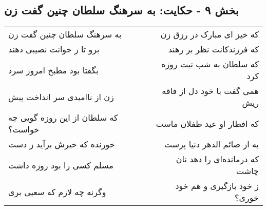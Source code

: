 \begin{center}
\section*{بخش ۹ - حکایت: به سرهنگ سلطان چنین گفت زن}
\label{sec:009}
\begin{longtable}{l p{0.5cm} r}
به سرهنگ سلطان چنین گفت زن
&&
که خیز ای مبارک در رزق زن
\\
برو تا ز خوانت نصیبی دهند
&&
که فرزندکانت نظر بر رهند
\\
بگفتا بود مطبخ امروز سرد
&&
که سلطان به شب نیت روزه کرد
\\
زن از ناامیدی سر انداخت پیش
&&
همی گفت با خود دل از فاقه ریش
\\
که سلطان از این روزه گویی چه خواست؟
&&
که افطار او عید طفلان ماست
\\
خورنده که خیرش برآید ز دست
&&
به از صائم الدهر دنیا پرست
\\
مسلم کسی را بود روزه داشت
&&
که درمانده‌ای را دهد نان چاشت
\\
وگرنه چه لازم که سعیی بری
&&
ز خود بازگیری و هم خود خوری؟
\\
\end{longtable}
\end{center}
